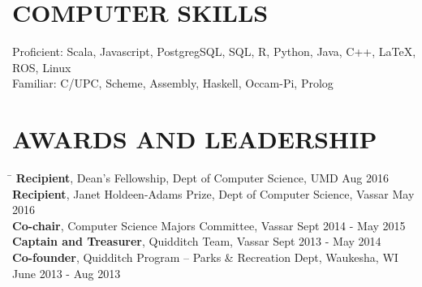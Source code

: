 \documentclass{res}
\begin{document}
\begin{resume}
{  \vspace{-1pt}
  \section{\hspace{0.2in}COMPUTER SKILLS}
    \vspace{3pt}
      Proficient: Scala, Javascript, PostgregSQL, SQL, R, Python, Java, C++, LaTeX, ROS, Linux\\
      Familiar: C/UPC, Scheme, Assembly, Haskell, Occam-Pi, Prolog\\

  \vspace{-16pt}
  \section{\hspace{0.2in}AWARDS AND LEADERSHIP}
    \vspace{-3pt}
    \begin{tabbing}
      \hspace{5.65in}\=  \kill %
      {\bf Recipient}, Dean's Fellowship, Dept of Computer Science, UMD\>
          Aug 2016\\
      {\bf Recipient}, Janet Holdeen-Adams Prize, Dept of Computer Science, Vassar\>
          May 2016\\
      {\bf Co-chair}, Computer Science Majors Committee, Vassar\>
          Sept 2014 - May 2015\\
      {\bf Captain and Treasurer}, Quidditch Team, Vassar\>
          Sept 2013 - May 2014\\
      {\bf Co-founder}, Quidditch Program -- Parks \& Recreation Dept, Waukesha, WI\>
           June 2013 - Aug 2013\\
    \end{tabbing}
} %
\end{resume}
\end{document}
